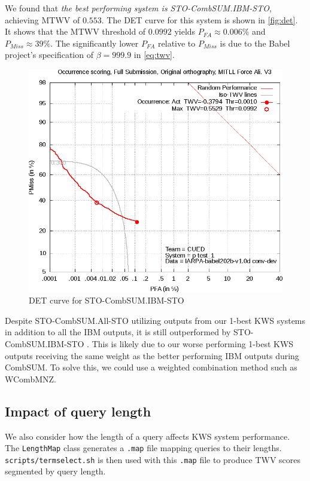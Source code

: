 \documentclass[a4paper,oneside,reqno]{amsart}
\begin{document}
We found that \emph{the best performing system is STO-CombSUM.IBM-STO},
achieving MTWV of $0.553$. The DET curve for this system is shown in
\autoref{fig:det}.  It shows that the MTWV threshold of $0.0992$ yields $P_{FA}
\approx 0.006 \%$ and $P_{Miss} \approx 39\%$. The significantly lower $P_{FA}$
relative to $P_{Miss}$ is due to the Babel project's specification of $\beta =
999.9$ in \autoref{eq:twv}.

\begin{figure}[ht!]
  \begin{center}
    \includegraphics[scale=0.5]{Figures/sto-combSUM-det.png}
  \end{center}
  \caption{DET curve for STO-CombSUM.IBM-STO}
  \label{fig:det}
\end{figure}

Despite STO-CombSUM.All-STO utilizing outputs from our 1-best KWS systems in
addition to all the IBM outputs, it is still outperformed by
STO-CombSUM.IBM-STO . This is likely due to our worse performing 1-best KWS
outputs receiving the same weight as the better performing IBM outputs during
CombSUM.  To solve this, we could use a weighted combination method such as
WCombMNZ\cite{mamou2013system}.

\subsection{Impact of query length}

We also consider how the length of a query affects KWS system performance. The
\texttt{LengthMap} class generates a \texttt{.map} file mapping queries to
their lengths.  \texttt{scripts/termselect.sh} is then used with this
\texttt{.map} file to produce TWV scores segmented by query length.
\end{document}
